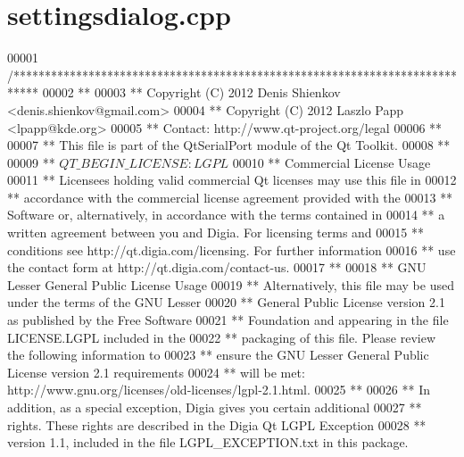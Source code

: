 \hypertarget{a00131_source}{\section{settingsdialog.\+cpp}
\label{a00131_source}
}

\begin{DoxyCode}
00001 \textcolor{comment}{/****************************************************************************}
00002 \textcolor{comment}{**}
00003 \textcolor{comment}{** Copyright (C) 2012 Denis Shienkov <denis.shienkov@gmail.com>}
00004 \textcolor{comment}{** Copyright (C) 2012 Laszlo Papp <lpapp@kde.org>}
00005 \textcolor{comment}{** Contact: http://www.qt-project.org/legal}
00006 \textcolor{comment}{**}
00007 \textcolor{comment}{** This file is part of the QtSerialPort module of the Qt Toolkit.}
00008 \textcolor{comment}{**}
00009 \textcolor{comment}{** $QT\_BEGIN\_LICENSE:LGPL$}
00010 \textcolor{comment}{** Commercial License Usage}
00011 \textcolor{comment}{** Licensees holding valid commercial Qt licenses may use this file in}
00012 \textcolor{comment}{** accordance with the commercial license agreement provided with the}
00013 \textcolor{comment}{** Software or, alternatively, in accordance with the terms contained in}
00014 \textcolor{comment}{** a written agreement between you and Digia.  For licensing terms and}
00015 \textcolor{comment}{** conditions see http://qt.digia.com/licensing.  For further information}
00016 \textcolor{comment}{** use the contact form at http://qt.digia.com/contact-us.}
00017 \textcolor{comment}{**}
00018 \textcolor{comment}{** GNU Lesser General Public License Usage}
00019 \textcolor{comment}{** Alternatively, this file may be used under the terms of the GNU Lesser}
00020 \textcolor{comment}{** General Public License version 2.1 as published by the Free Software}
00021 \textcolor{comment}{** Foundation and appearing in the file LICENSE.LGPL included in the}
00022 \textcolor{comment}{** packaging of this file.  Please review the following information to}
00023 \textcolor{comment}{** ensure the GNU Lesser General Public License version 2.1 requirements}
00024 \textcolor{comment}{** will be met: http://www.gnu.org/licenses/old-licenses/lgpl-2.1.html.}
00025 \textcolor{comment}{**}
00026 \textcolor{comment}{** In addition, as a special exception, Digia gives you certain additional}
00027 \textcolor{comment}{** rights.  These rights are described in the Digia Qt LGPL Exception}
00028 \textcolor{comment}{** version 1.1, included in the file LGPL\_EXCEPTION.txt in this package.}

\end{DoxyCode}
